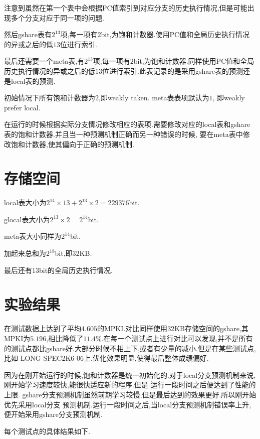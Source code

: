 \documentclass[adobefonts, nocap]{ctexart}
\begin{document}
    注意到虽然在第一个表中会根据PC值索引到对应分支的历史执行情况,但是可能出现多个分支对应于同一项的问题.

    然后gshare表有$2^{13}$项,每一项有$2$bit,为饱和计数器.使用PC值和全局历史执行情况的异或之后的低$13$位进行索引.

    最后还需要一个meta表,有$2^{13}$项,每一项有$2$bit,为饱和计数器.同样使用PC值和全局历史执行情况的异或之后的低$13$位进行索引.此表记录的是采用gshare表的预测还是local表的预测.

    初始情况下所有饱和计数器为$2$,即weakly taken. meta表表项默认为$1$, 即weakly prefer local.

    在运行的时候根据实际分支情况修改相应的表项.需要修改对应的local表和gshare表的饱和计数器.并且当一种预测机制正确而另一种错误的时候,
    要在meta表中修改饱和计数器,使其偏向于正确的预测机制.
  \section{存储空间}
    local表大小为$2^{14}\times 13+2^{13}\times 2=229376$bit.

    glocal表大小为$2^{13}\times 2=2^{14}$bit.

    meta表大小同样为$2^{14}$bit.

    加起来总和为$2^{18}$bit,即$32$KB.

    最后还有$13$bit的全局历史执行情况.
  \section{实验结果}
    在测试数据上达到了平均$4.605$的MPKI.对比同样使用$32$KB存储空间的gshare,其MPKI为$5.196$,相比降低了$11.4\%$.在每一个测试点上进行对比可以发现,并不是所有的测试点都比gshare好.大部分时候不相上下,或者有少量的减小.但是在某些测试点,比如
    LONG-SPEC2K6-06上,优化效果明显,使得最后整体成绩偏好.

    因为在刚开始运行的时候,饱和计数器是统一初始化的.对于local分支预测机制来说,刚开始学习速度较快,能很快适应新的程序.但是
    运行一段时间之后便达到了性能的上限. gshare分支预测机制虽然前期学习较慢,但是最后达到的效果更好.所以刚开始优先采用local分支
    预测机制.运行一段时间之后,当local分支预测机制错误率上升,便开始采用gshare分支预测机制.

    每个测试点的具体结果如下.
\end{document}
